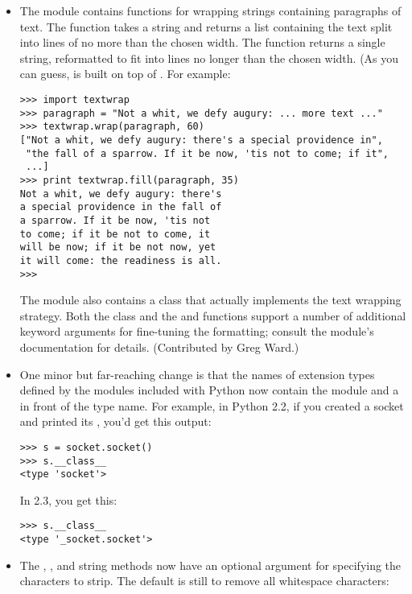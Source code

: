 \documentclass{howto}
\begin{document}
\begin{itemize}

\item The  module contains functions for wrapping
strings containing paragraphs of text.  The  function takes a string and returns a list containing
the text split into lines of no more than the chosen width.  The
 function returns a single
string, reformatted to fit into lines no longer than the chosen width.
(As you can guess,  is built on top of
.  For example:

\begin{verbatim}
>>> import textwrap
>>> paragraph = "Not a whit, we defy augury: ... more text ..."
>>> textwrap.wrap(paragraph, 60)
["Not a whit, we defy augury: there's a special providence in", 
 "the fall of a sparrow. If it be now, 'tis not to come; if it", 
 ...]
>>> print textwrap.fill(paragraph, 35)
Not a whit, we defy augury: there's
a special providence in the fall of
a sparrow. If it be now, 'tis not
to come; if it be not to come, it
will be now; if it be not now, yet
it will come: the readiness is all.
>>> 
\end{verbatim}

The module also contains a  class that actually
implements the text wrapping strategy.   Both the 
 class and the  and
 functions support a number of additional keyword
arguments for fine-tuning the formatting; consult the module's
documentation for details. 
(Contributed by Greg Ward.)

\item One minor but far-reaching change is that the names of extension
types defined by the modules included with Python now contain the
module and a  in front of the type name.  For example, in
Python 2.2, if you created a socket and printed its
, you'd get this output:

\begin{verbatim}
>>> s = socket.socket()
>>> s.__class__
<type 'socket'>
\end{verbatim}

In 2.3, you get this:
\begin{verbatim}
>>> s.__class__
<type '_socket.socket'>
\end{verbatim}

\item The , , and 
string methods now have an optional argument for specifying the
characters to strip.  The default is still to remove all whitespace
characters:


\end{itemize}
\end{document}
